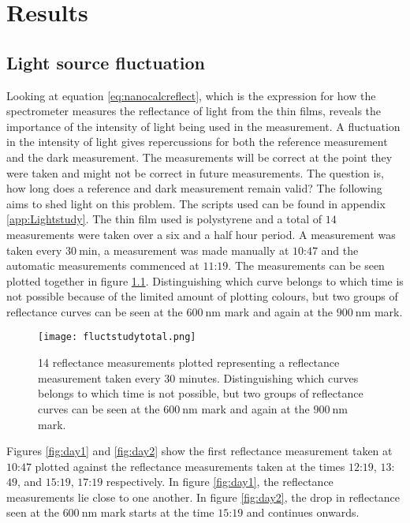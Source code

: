 \documentclass[MasterThesisMain.tex]{subfiles}
\begin{document}
\chapter{Results} \label{ch:results}

\section{Light source fluctuation}
Looking at equation \ref{eq:nanocalcreflect}, which is the expression for how the spectrometer measures the reflectance of light from the thin films, reveals the importance of the intensity of light being used in the measurement. A fluctuation in the intensity of light gives repercussions for both the reference measurement and the dark measurement. The measurements will be correct at the point they were taken and might not be correct in future measurements. The question is, how long does a reference and dark measurement remain valid? The following aims  to shed light on this problem. The scripts used can be found in appendix \ref{app:Lightstudy}. The thin film used is polystyrene and a total of $14$ measurements were taken over a six and a half hour period. A measurement was taken every $\SI{30}{\minute}$, a measurement was made manually at $10$:$47$ and the automatic measurements commenced at $11$:$19$. The measurements can be seen plotted together in figure \ref{fig:daytotal}. Distinguishing which curve belongs to which time is not possible because of the limited amount of plotting colours, but two groups of reflectance curves can be seen at the $\SI{600}{\nano\meter}$ mark and again at the $\SI{900}{\nano\meter}$ mark.
  
\begin{figure}
\centering
\texttt{[image: fluctstudytotal.png]}
\caption{14 reflectance measurements plotted representing a reflectance measurement taken every $30$ minutes. Distinguishing which curves belongs to which time is not possible, but two groups of reflectance curves can be seen at the $\SI{600}{\nano\meter}$ mark and again at the $\SI{900}{\nano\meter}$ mark.}
\label{fig:daytotal}
\end{figure}

Figures \ref{fig:day1} and \ref{fig:day2} show the first reflectance measurement taken at $10$:$47$ plotted against the reflectance measurements taken at the times $12$:$19$, $13$:$49$, and $15$:$19$, $17$:$19$ respectively. In figure \ref{fig:day1}, the reflectance measurements lie close to one another. In figure \ref{fig:day2}, the drop in reflectance seen at the $\SI{600}{\nano\meter}$ mark starts at the time $15$:$19$ and continues onwards. 
\end{document}
